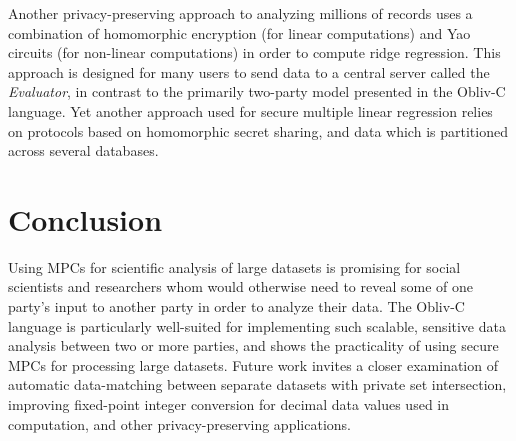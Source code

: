 \documentclass[conference]{IEEEtran}
\begin{document}
Another privacy-preserving approach to analyzing millions of records uses a
combination of homomorphic encryption (for linear computations) and Yao circuits 
(for non-linear computations) in order to compute ridge regression\cite{ridgeregression}.
This approach is designed for many users to send data to a central server called the 
\emph{Evaluator}, in contrast to the primarily two-party model presented in the Obliv-C
language. Yet another approach used for secure multiple linear regression 
relies on protocols based on homomorphic secret sharing, and data which is partitioned 
across several databases\cite{secretsharing}.
 
\section{Conclusion}
Using MPCs for scientific analysis of large datasets is promising for social scientists
and researchers whom would otherwise need to reveal some of one party's input to another
party in order to analyze their data. 
The Obliv-C language is particularly well-suited for implementing such scalable, 
sensitive data analysis between two or more parties, and shows the practicality of 
using secure MPCs for processing large datasets.
Future work invites a closer examination of automatic data-matching between
separate datasets with private set intersection, improving fixed-point integer 
conversion for decimal data values used in computation, and other privacy-preserving
applications.
\end{document}

